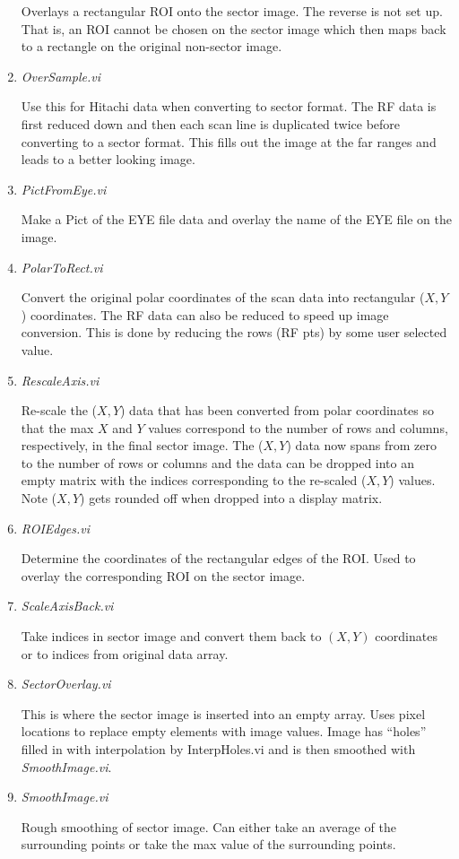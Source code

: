 \documentclass[10pt]{article}
\begin{document}
\begin{enumerate}
Overlays a rectangular ROI onto the sector image. The reverse is
not set up. That is, an ROI cannot be chosen on the sector image
which then maps back to a rectangle on the original non-sector
image.

\item {\it OverSample.vi}

Use this for Hitachi data when converting to sector format. The RF
data is first reduced down and then each scan line is duplicated
twice before converting to a sector format. This fills out the
image at the far ranges and leads to a better looking image.

\item {\it PictFromEye.vi}

Make a Pict of the EYE file data and overlay the name of the EYE
file on the image.

\item {\it PolarToRect.vi}

Convert the original polar coordinates of the scan data into
rectangular ($X,Y$) coordinates. The RF data can also be reduced
to speed up image conversion. This is done by reducing the rows
(RF pts) by some user selected value.

\item {\it RescaleAxis.vi}

Re-scale the ($X,Y$) data that has been converted from polar
coordinates so that the max $X$ and $Y$ values correspond to the
number of rows and columns, respectively, in the final sector
image. The ($X,Y$) data now spans from zero to the number of rows
or columns and the data can be dropped into an empty matrix with
the indices corresponding to the re-scaled ($X,Y$) values. Note
($X,Y$) gets rounded off when dropped into a display matrix.

\item {\it ROIEdges.vi}

Determine the coordinates of the rectangular edges of the ROI.
Used to overlay the corresponding ROI on the sector image.

\item {\it ScaleAxisBack.vi}

Take indices in sector image and convert them back to $(X,Y)$
coordinates or to indices from original data array.

\item {\it SectorOverlay.vi}

This is where the sector image is inserted into an empty array.
Uses pixel locations to replace empty elements with image values.
Image has ``holes'' filled in with interpolation by InterpHoles.vi
and is then smoothed with {\it SmoothImage.vi}.

\item {\it SmoothImage.vi}

Rough smoothing of sector image. Can either take an average of the
surrounding points or take the max value of the surrounding
points.

\end{enumerate}
\end{document}
